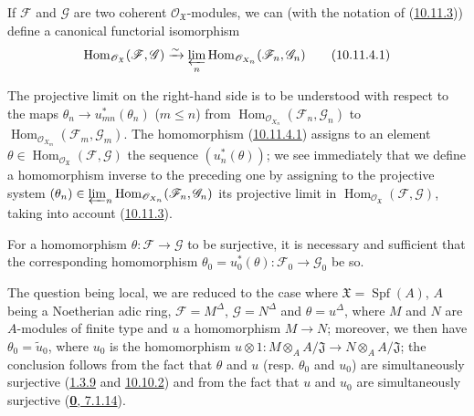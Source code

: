 \begin{corollary}[10.11.4]
\label{I.10.11.4}
If $\mathscr{F}$ and $\mathscr{G}$ are two coherent
$\mathscr{O}_{\mathfrak{X}}$-modules, we can \textup{(with the
notation of (\hyperref[I.10.11.3]{10.11.3}))} define a
canonical functorial isomorphism
\[
  \label{I.10.11.4.1}
  \operatorname{Hom}_{\mathscr{O}_{\mathfrak{X}}}
  (\mathscr{F},\mathscr{G})
  \xrightarrow{\sim}
  \varprojlim_n
  \operatorname{Hom}_{\mathscr{O}_{X_n}}
  (\mathscr{F}_n,\mathscr{G}_n)
  \tag{10.11.4.1}
\]
\end{corollary}

The projective limit on the right-hand side is to be understood with
respect to the maps
$\theta_n\to u_{mn}^*(\theta_n)$ ($m\leq n$) from
$\operatorname{Hom}_{\mathscr{O}_{X_n}}
(\mathscr{F}_n,\mathscr{G}_n)$ to
$\operatorname{Hom}_{\mathscr{O}_{X_m}}
(\mathscr{F}_m,\mathscr{G}_m)$. The homomorphism
(\hyperref[I.10.11.4.1]{10.11.4.1}) assigns to an element
$\theta\in\operatorname{Hom}_{\mathscr{O}_{\mathfrak{X}}}
(\mathscr{F},\mathscr{G})$ the sequence $(u_n^*(\theta))$; we see
immediately that we define a homomorphism inverse to the preceding one by
assigning to the projective system
$(\theta_n)\in\varprojlim_n
\operatorname{Hom}_{\mathscr{O}_{X_n}}
(\mathscr{F}_n,\mathscr{G}_n)$
its projective limit in
$\operatorname{Hom}_{\mathscr{O}_{\mathfrak{X}}}
(\mathscr{F},\mathscr{G})$, taking into account
(\hyperref[I.10.11.3]{10.11.3}).

\begin{corollary}[10.11.5]
\label{I.10.11.5}
For a homomorphism $\theta:\mathscr{F}\to\mathscr{G}$ to be
surjective, it is necessary and sufficient that the corresponding homomorphism
$\theta_0=u_0^*(\theta):\mathscr{F}_0\to\mathscr{G}_0$ be so.
\end{corollary}

The question being local, we are reduced to the case where
$\mathfrak{X}=\operatorname{Spf}(A)$, $A$ being a Noetherian adic ring,
$\mathscr{F}=M^\Delta$, $\mathscr{G}=N^\Delta$ and $\theta=u^\Delta$,
where $M$ and $N$ are $A$-modules of finite type and $u$ a
homomorphism $M\to N$; moreover, we then have
$\theta_0=\widetilde{u}_0$, where $u_0$ is the homomorphism
$u\otimes1:M\otimes_A A/\mathfrak{J}\to
N\otimes_A A/\mathfrak{J}$;
the conclusion follows from the fact that $\theta$ and $u$ (resp. $\theta_0$ and
$u_0$) are simultaneously surjective
(\hyperref[I.1.3.9]{1.3.9} and
\hyperref[I.10.10.2]{10.10.2}) and from the fact that $u$ and $u_0$ are
simultaneously surjective (\hyperref[0.7.1.14]{\textbf{0}, 7.1.14}).

